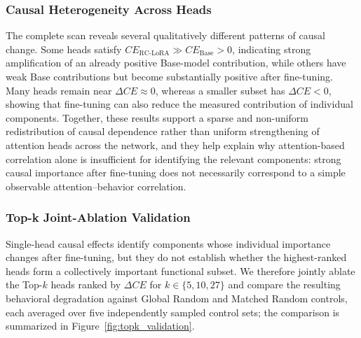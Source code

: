 \subsubsection{Causal Heterogeneity Across Heads}

The complete scan reveals several qualitatively different patterns of causal change. Some heads satisfy $CE_{\mathrm{RC\text{-}LoRA}}\gg CE_{\mathrm{Base}}>0$, indicating strong amplification of an already positive Base-model contribution, while others have weak Base contributions but become substantially positive after fine-tuning. Many heads remain near $\Delta CE\approx0$, whereas a smaller subset has $\Delta CE<0$, showing that fine-tuning can also reduce the measured contribution of individual components. Together, these results support a sparse and non-uniform redistribution of causal dependence rather than uniform strengthening of attention heads across the network, and they help explain why attention-based correlation alone is insufficient for identifying the relevant components: strong causal importance after fine-tuning does not necessarily correspond to a simple observable attention--behavior correlation.

\subsubsection{Top-k Joint-Ablation Validation}

Single-head causal effects identify components whose individual importance changes after fine-tuning, but they do not establish whether the highest-ranked heads form a collectively important functional subset. We therefore jointly ablate the Top-$k$ heads ranked by $\Delta CE$ for $k\in\{5,10,27\}$ and compare the resulting behavioral degradation against Global Random and Matched Random controls, each averaged over five independently sampled control sets; the comparison is summarized in Figure~\ref{fig:topk_validation}.

